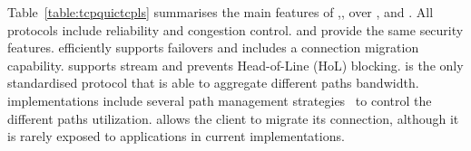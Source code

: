 Table~\ref{table:tcpquictcpls} summarises the main features of \tcp,\mptcp, 
\tls over \tcp, and \quic. All protocols include reliability and congestion 
control. \tls and \quic provide the same security features. \mptcp efficiently 
supports failovers and \quic includes a connection migration capability. \quic 
supports stream and prevents Head-of-Line (HoL) blocking. \mptcp is the only
standardised protocol that is able to aggregate different paths bandwidth. 
\mptcp implementations include several path management 
strategies~\cite{hesmans2015smapp,hesmans2016enhanced} to control the different 
paths utilization. \quic allows the client to migrate its connection, although 
it is rarely exposed to applications in current implementations. 













